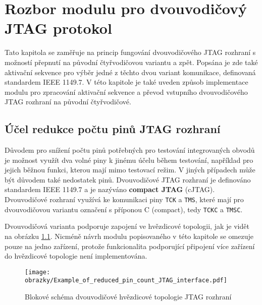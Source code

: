 \chapter{Rozbor modulu pro dvouvodičový \acs{JTAG} protokol}
Tato kapitola se zaměřuje na princip fungování dvouvodičového \acs{JTAG} rozhraní s možností přepnutí na původní čtyřvodičovou variantu a zpět. Popsána je zde také aktivační sekvence pro výběr jedné z těchto dvou variant komunikace, definovaná standardem IEEE 1149.7. V této kapitole je také uveden způsob implementace modulu pro zpracování aktivační sekvence a převod vstupního dvouvodičového \acs{JTAG} rozhraní na původní čtyřvodičové. %
	
\section{Účel redukce počtu pinů \acs{JTAG} rozhraní}	\label{sec:2w_interface}
Důvodem pro snížení počtu pinů potřebných pro testování integrovaných obvodů je možnost využít dva volné piny k jinému účelu během testování, například pro jejich běžnou funkci, kterou mají mimo testovací režim. V jiných případech může být důvodem také nedostatek pinů. Dvouvodičové \acs{JTAG} rozhraní je definováno standardem IEEE 1149.7 a je nazýváno \textbf{compact \acs{JTAG}} (c\acs{JTAG}). Dvouvodičové rozhraní využívá ke komunikaci piny \texttt{\acs{TCK}} a \texttt{\acs{TMS}}, které mají pro dvouvodičovou variantu označení s příponou C (compact), tedy \texttt{\acs{TCKC}} a \texttt{\acs{TMSC}}. \cite{IEEE_1149-7} \cite{JTAG}

Dvouvodičová varianta podporuje zapojení ve hvězdicové topologii, jak je vidět na obrázku \ref{fig:star2_sch}. Nicméně návrh modulu popisovaného v této kapitole se omezuje pouze na jedno zařízení, protože funkcionalita podporující připojení více zařízení do hvězdicové topologie není implementována.

\begin{figure}[!h]
  \begin{center}
    \texttt{[image: obrazky/Example\_of\_reduced\_pin\_count\_JTAG\_interface.pdf]}
  \end{center}
  \caption{Blokové schéma dvouvodičové hvězdicové topologie \acs{JTAG} rozhraní \cite{JTAG}}
	\label{fig:star2_sch}
\end{figure}

